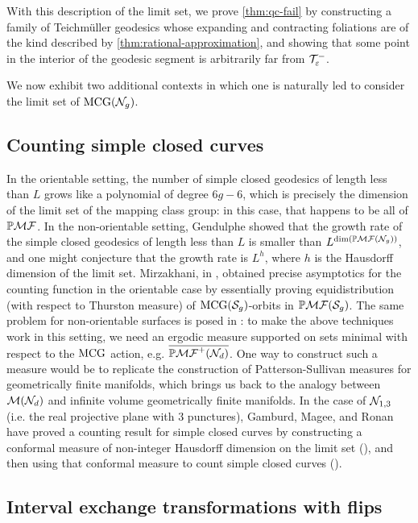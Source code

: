 With this description of the limit set, we prove \autoref{thm:qc-fail} by constructing a family of Teichmüller geodesics whose expanding and contracting foliations are of the kind described by \autoref{thm:rational-approximation}, and showing that some point in the interior of the geodesic segment is arbitrarily far from $\mathcal{T}_{\varepsilon}^{-}$.

We now exhibit two additional contexts in which one is naturally led to consider the limit set of $\mathrm{MCG}(\mathcal{N}_g)$.

\subsection*{Counting simple closed curves}

In the orientable setting, the number of simple closed geodesics of length less than $L$ grows like a polynomial of degree $6g-6$, which is precisely the dimension of the limit set of the mapping class group: in this case, that happens to be all of $\mathbb{P}\mathcal{MF}$.
In the non-orientable setting, Gendulphe showed that the growth rate of the simple closed geodesics of length less than $L$ is smaller than $L^{\dim(\mathbb{P}\mathcal{MF}(\mathcal{N}_g))}$, and one might conjecture that the growth rate is $L^h$, where $h$ is the Hausdorff dimension of the limit set.
Mirzakhani, in \autocite{mirzakhani2008growth}, obtained precise asymptotics for the counting function in the orientable case by essentially proving equidistribution (with respect to Thurston measure) of $\mathrm{MCG}(\mathcal{S}_{g})$-orbits in $\mathbb{P}\mathcal{MF}(\mathcal{S}_g)$.
The same problem for non-orientable surfaces is posed in \cite[Problem 9.2]{wright2020tour}: to make the above techniques work in this setting, we need an ergodic measure supported on sets
minimal with respect to the $\mathrm{MCG}$ action, e.g. $\overline{\mathbb{P}\mathcal{MF}^+(\mathcal{N}_d)}$.
One way to construct such a measure would be to replicate the construction of Patterson-Sullivan measures for geometrically finite manifolds, which brings us back
to the analogy between $\mathcal{M}(\mathcal{N}_d)$ and infinite volume geometrically finite manifolds.
In the case of $\mathcal{N}_{1,3}$ (i.e. the real projective plane with $3$ punctures), Gamburd, Magee, and Ronan have proved a counting result for simple closed curves by constructing a conformal measure of non-integer Hausdorff dimension on the limit set (\cite[Theorem 10]{10.4007/annals.2019.190.3.2}), and then using that conformal measure to count simple closed curves (\cite[Theorem 2]{10.1093/imrn/rny112}).

\subsection*{Interval exchange transformations with flips}


